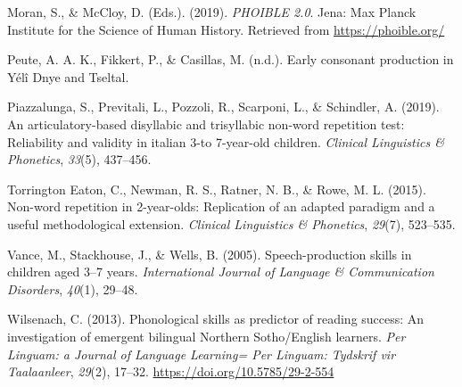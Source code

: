 \documentclass[english,,man,floatsintext]{apa6}
\begin{document}
\leavevmode\hypertarget{ref-phoible}{}%
Moran, S., \& McCloy, D. (Eds.). (2019). \emph{PHOIBLE 2.0}. Jena: Max Planck Institute for the Science of Human History. Retrieved from \url{https://phoible.org/}

\leavevmode\hypertarget{ref-peuteIPconsonants}{}%
Peute, A. A. K., Fikkert, P., \& Casillas, M. (n.d.). Early consonant production in Yélî Dnye and Tseltal.

\leavevmode\hypertarget{ref-piazzalunga2019articulatory}{}%
Piazzalunga, S., Previtali, L., Pozzoli, R., Scarponi, L., \& Schindler, A. (2019). An articulatory-based disyllabic and trisyllabic non-word repetition test: Reliability and validity in italian 3-to 7-year-old children. \emph{Clinical Linguistics \& Phonetics}, \emph{33}(5), 437--456.

\leavevmode\hypertarget{ref-torrington2015non}{}%
Torrington Eaton, C., Newman, R. S., Ratner, N. B., \& Rowe, M. L. (2015). Non-word repetition in 2-year-olds: Replication of an adapted paradigm and a useful methodological extension. \emph{Clinical Linguistics \& Phonetics}, \emph{29}(7), 523--535.

\leavevmode\hypertarget{ref-vance2005speech}{}%
Vance, M., Stackhouse, J., \& Wells, B. (2005). Speech-production skills in children aged 3--7 years. \emph{International Journal of Language \& Communication Disorders}, \emph{40}(1), 29--48.

\leavevmode\hypertarget{ref-wilsenach2013phonological}{}%
Wilsenach, C. (2013). Phonological skills as predictor of reading success: An investigation of emergent bilingual Northern Sotho/English learners. \emph{Per Linguam: a Journal of Language Learning= Per Linguam: Tydskrif vir Taalaanleer}, \emph{29}(2), 17--32. \url{https://doi.org/10.5785/29-2-554}
\end{document}
